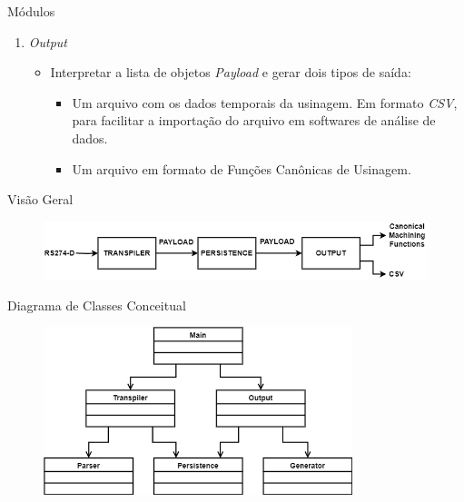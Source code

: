 \documentclass[aspectratio=169]{beamer}
\begin{document}
{\begin{frame}{Módulos}
\begin{enumerate}
    \item {
      \emph{Output}
      \begin{itemize}
        \item Interpretar a lista de objetos \emph{Payload} 
              e gerar dois tipos de saída:
        \begin{itemize}
              \item Um arquivo com os dados temporais da usinagem. 
                    Em formato \emph{CSV}, para facilitar a importação 
                    do arquivo em softwares de análise de dados.
              \item Um arquivo em formato de Funções Canônicas de Usinagem.
        \end{itemize}
      \end{itemize}
    }

  \end{enumerate}
\end{frame}


\begin{frame}{Visão Geral}

  \begin{figure}[H]
    \centering
    \includegraphics[width=\textwidth]{images/idef0-main.png}
  \end{figure}

\end{frame}


\begin{frame}{Diagrama de Classes Conceitual}

  \begin{figure}[H]
    \centering
    \includegraphics[width=90mm]{images/class-main.png}
  \end{figure}

\end{frame}


}
\end{document}

